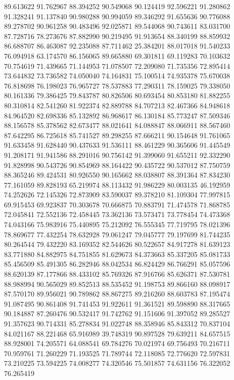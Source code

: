 89.613622
91.762967
88.394252
90.549068
90.124419
92.596221
91.280862
91.328241
91.137840
90.980288
90.994059
89.346292
91.655636
90.776088
89.278702
90.961258
90.483496
92.025871
89.544068
90.743611
83.031700
87.728716
78.273676
87.882990
90.219495
91.913654
88.340199
88.859932
86.688707
86.463087
92.235088
87.711462
25.384201
88.017018
91.540233
76.094918
63.174570
86.156065
89.665880
69.301811
69.119283
70.103632
70.754619
71.439665
71.144953
71.078507
72.209080
71.735356
72.895414
73.644832
73.736582
74.050040
74.164831
75.100514
74.935378
75.670038
76.818698
76.198023
76.965727
78.537883
77.290311
78.159025
79.338050
80.161336
79.386425
79.843787
80.826506
80.693454
80.853180
81.882255
80.310814
82.541260
81.922374
82.889788
84.707213
82.467366
84.948618
84.964520
82.698336
85.132892
86.968617
86.130184
85.773247
87.509346
88.156578
85.378562
82.673477
88.021641
84.088847
88.066911
88.567460
87.642295
86.725618
85.741527
89.298255
87.666211
90.154648
91.761065
91.633458
91.628440
90.437633
91.536111
88.461229
90.365606
91.445549
91.208171
91.941586
88.291016
90.756142
91.399060
91.655211
92.332290
91.828998
90.543726
90.854969
88.164422
90.435722
90.537012
87.750759
88.365246
89.424531
80.926550
90.165662
88.038807
88.391364
87.834230
77.161059
89.828193
65.219974
88.113432
91.986229
80.003135
46.192959
74.252626
72.145326
72.873909
83.590037
89.378210
81.109304
77.997815
69.915453
69.923837
70.303678
70.666875
70.883791
71.474578
71.868785
72.045841
72.552136
72.458445
73.362136
73.573471
73.778454
74.473368
74.043166
75.983916
75.440895
75.212092
76.555345
77.719795
78.021396
78.869677
77.432254
78.632928
79.061247
79.045777
79.197699
81.744235
80.264544
79.432220
83.169352
82.544626
80.522657
84.917278
81.639123
83.771880
84.882975
84.751855
81.629673
84.373663
85.337205
85.081733
85.456509
85.491305
86.282946
88.042534
86.824429
86.766291
85.057596
88.620139
87.177866
88.433102
85.769326
87.916766
85.626371
87.530781
88.988994
90.565029
89.852513
88.535452
91.198753
89.866160
88.098917
87.570170
89.956021
90.789862
88.867275
89.216260
88.603783
87.195474
91.087495
90.861408
91.741453
91.922611
91.361521
89.598890
88.317665
90.184887
87.260476
90.532417
91.742762
91.151606
91.397052
89.285527
91.357623
90.714331
85.278834
91.022748
88.358946
85.843312
70.837104
84.021167
88.221468
65.916989
39.748319
90.897528
79.639211
84.657515
88.928001
74.205571
64.088541
69.784276
70.021974
69.756493
70.216711
70.959761
71.260229
71.193525
71.789744
72.118085
72.776620
72.597831
73.210225
73.594225
74.008277
74.320546
75.501857
74.631156
76.322052
76.265419
